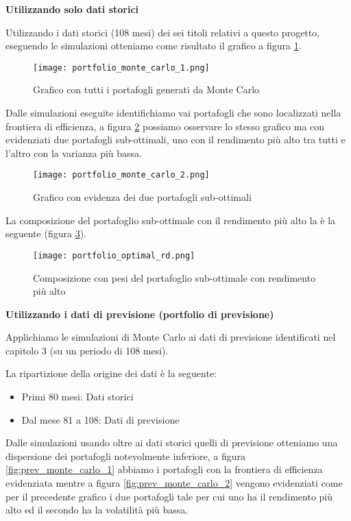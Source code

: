 \textbf{Utilizzando solo dati storici}

Utilizzando i dati storici (108 mesi) dei sei titoli relativi a questo progetto, eseguendo le simulazioni otteniamo come risultato il grafico a figura \ref{fig:pf_monte_carlo_1}.

\begin{figure}[ht]
    \centering
    \texttt{[image: portfolio\_monte\_carlo\_1.png]}
    \caption{Grafico con tutti i portafogli generati da Monte Carlo}
    \label{fig:pf_monte_carlo_1}
\end{figure}

\pagebreak

Dalle simulazioni eseguite identifichiamo vai portafogli che sono localizzati nella frontiera di efficienza, a figura \ref{fig:pf_monte_carlo_2} possiamo osservare
lo stesso grafico ma con evidenziati due portafogli sub-ottimali, uno con il rendimento più alto tra tutti e l'altro con la varianza più bassa.

\begin{figure}[ht]
    \centering
    \texttt{[image: portfolio\_monte\_carlo\_2.png]}
    \caption{Grafico con evidenza dei due portafogli sub-ottimali}
    \label{fig:pf_monte_carlo_2}
\end{figure}

La composizione del portafoglio sub-ottimale con il rendimento più alto la è la seguente (figura \ref{fig:pf_optimal_rd}).

\begin{figure}[ht]
    \centering
    \texttt{[image: portfolio\_optimal\_rd.png]}
    \caption{Composizione con pesi del portafoglio sub-ottimale con rendimento più alto}
    \label{fig:pf_optimal_rd}
\end{figure}

\textbf{Utilizzando i dati di previsione (portfolio di previsione)}

Applichiamo le simulazioni di Monte Carlo ai dati di previsione identificati nel capitolo 3 (su un periodo di 108 mesi).

La ripartizione della origine dei dati è la seguente:
\begin{itemize}
    \item Primi 80 mesi: Dati storici
    \item Dal mese 81 a 108: Dati di previsione
\end{itemize}

Dalle simulazioni usando oltre ai dati storici quelli di previsione otteniamo una dispersione dei portafogli notevolmente inferiore, a figura \ref{fig:prev_monte_carlo_1}
abbiamo i portafogli con la frontiera di efficienza evidenziata mentre a figura \ref{fig:prev_monte_carlo_2} vengono evidenziati come per il precedente grafico i due portafogli tale
per cui uno ha il rendimento più alto ed il secondo ha la volatilità più bassa.

